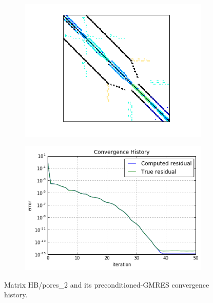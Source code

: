 \begin{figure}[h]
	\centering
	\begin{subfigure}[t]{0.45\linewidth}
		\centering
		\includegraphics[width=1.1\linewidth]{figures/pores_2/matrix.png}
		\caption{}	
	\end{subfigure}
	\quad
	\begin{subfigure}[t]{0.45\linewidth}
		\centering
		\includegraphics[width=1.15\linewidth]{figures/pores_2/convergence_history.png}
		\caption{}
	\end{subfigure}
	\caption{Matrix HB/pores_2 and its preconditioned-GMRES convergence history.}\label{fig:pores_2}	
\end{figure}





